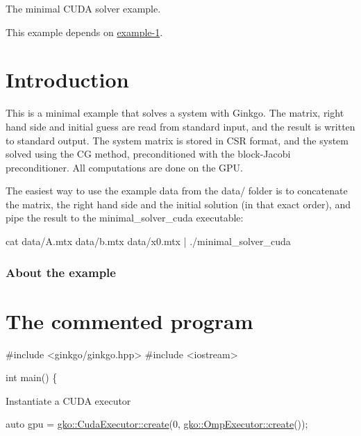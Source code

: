 The minimal C\+U\+DA solver example.

This example depends on \hyperlink{example_1}{example-\/1}.

 \label{_Intro}%
 \label{_Introduction}%
\section*{Introduction}

This is a minimal example that solves a system with Ginkgo. The matrix, right hand side and initial guess are read from standard input, and the result is written to standard output. The system matrix is stored in C\+SR format, and the system solved using the CG method, preconditioned with the block-\/\+Jacobi preconditioner. All computations are done on the G\+PU.

The easiest way to use the example data from the data/ folder is to concatenate the matrix, the right hand side and the initial solution (in that exact order), and pipe the result to the minimal\+\_\+solver\+\_\+cuda executable\+:


\begin{DoxyCode}
cat data/A.mtx data/b.mtx data/x0.mtx | ./minimal\_solver\_cuda
\end{DoxyCode}


\label{_Abouttheexample}%
\subsubsection*{About the example }

\label{_CommProg}%
 \section*{The commented program}


\begin{DoxyCode}
\textcolor{preprocessor}{#include <ginkgo/ginkgo.hpp>}
\textcolor{preprocessor}{#include <iostream>}

\textcolor{keywordtype}{int} main()
\{
\end{DoxyCode}


Instantiate a C\+U\+DA executor


\begin{DoxyCode}
\textcolor{keyword}{auto} gpu = \hyperlink{classgko_1_1CudaExecutor_a2718a92034350650ef406ffdb60db090}{gko::CudaExecutor::create}(0, 
      \hyperlink{classgko_1_1OmpExecutor_a33ca05fdd0fc928ee262fc9425304874}{gko::OmpExecutor::create}());
\end{DoxyCode}



